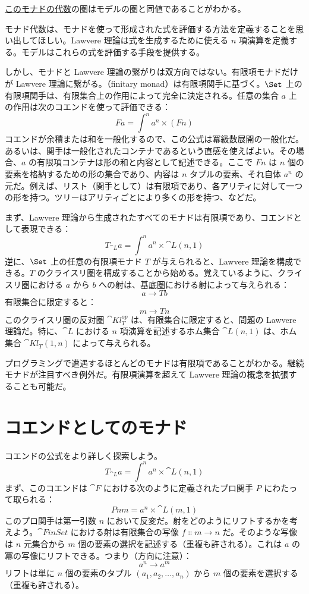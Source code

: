\hyperref[algebras-for-monads]{このモナドの代数}の圏はモデルの圏と同値であることがわかる。

モナド代数は、モナドを使って形成された式を評価する方法を定義することを思い出してほしい。Lawvere 理論は式を生成するために使える $n$ 項演算を定義する。モデルはこれらの式を評価する手段を提供する。

しかし、モナドと Lawvere 理論の繋がりは双方向ではない。有限項モナドだけが Lawvere 理論に繋がる。（finitary monad）は有限項関手に基づく。$\Set$ 上の有限項関手は、有限集合上の作用によって完全に決定される。任意の集合 $a$ 上の作用は次のコエンドを使って評価できる：
\[F a = \int^n a^n \times (F n)\]
コエンドが余積または和を一般化するので、この公式は冪級数展開の一般化だ。あるいは、関手は一般化されたコンテナであるという直感を使えばよい。その場合、$a$ の有限項コンテナは形の和と内容として記述できる。ここで $F n$ は $n$ 個の要素を格納するための形の集合であり、内容は $n$ タプルの要素、それ自体 $a^n$ の元だ。例えば、リスト（関手として）は有限項であり、各アリティに対して一つの形を持つ。ツリーはアリティごとにより多くの形を持つ、などだ。

まず、Lawvere 理論から生成されたすべてのモナドは有限項であり、コエンドとして表現できる：
\[T_{\cat{L}} a = \int^n a^n \times \cat{L}(n, 1)\]
逆に、$\Set$ 上の任意の有限項モナド $T$ が与えられると、Lawvere 理論を構成できる。$T$ のクライスリ圏を構成することから始める。覚えているように、クライスリ圏における $a$ から $b$ への射は、基底圏における射によって与えられる：
\[a \to T b\]
有限集合に限定すると：
\[m \to T n\]
このクライスリ圏の反対圏 $\cat{Kl}^\mathit{op}_{T}$ は、有限集合に限定すると、問題の Lawvere 理論だ。特に、$\cat{L}$ における $n$ 項演算を記述するホム集合 $\cat{L}(n, 1)$ は、ホム集合 $\cat{Kl}_{T}(1, n)$ によって与えられる。

プログラミングで遭遇するほとんどのモナドは有限項であることがわかる。継続モナドが注目すべき例外だ。有限項演算を超えて Lawvere 理論の概念を拡張することも可能だ。

\section{コエンドとしてのモナド}

コエンドの公式をより詳しく探索しよう。
\[T_{\cat{L}} a = \int^n a^n \times \cat{L}(n, 1)\]
まず、このコエンドは $\cat{F}$ における次のように定義されたプロ関手 $P$ にわたって取られる：
\[P n m = a^n \times \cat{L}(m, 1)\]
このプロ関手は第一引数 $n$ において反変だ。射をどのようにリフトするかを考えよう。$\cat{FinSet}$ における射は有限集合の写像 $f \Colon m \to n$ だ。そのような写像は $n$ 元集合から $m$ 個の要素の選択を記述する（重複も許される）。これは $a$ の冪の写像にリフトできる。つまり（方向に注意）：
\[a^n \to a^m\]
リフトは単に $n$ 個の要素のタプル $(a_1, a_2, \ldots{}, a_n)$ から $m$ 個の要素を選択する（重複も許される）。

